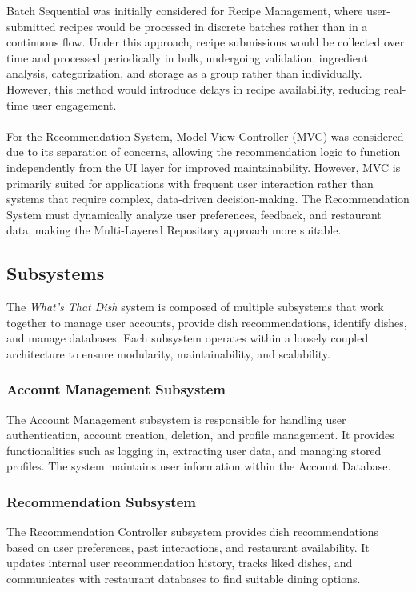 \documentclass[]{article}
\begin{document}
Batch Sequential was initially considered for Recipe Management, where user-submitted recipes would be processed in discrete batches rather than in a continuous flow. Under this approach, recipe submissions would be collected over time and processed periodically in bulk, undergoing validation, ingredient analysis, categorization, and storage as a group rather than individually. However, this method would introduce delays in recipe availability, reducing real-time user engagement. 
\\
\\
For the Recommendation System, Model-View-Controller (MVC) was considered due to its separation of concerns, allowing the recommendation logic to function independently from the UI layer for improved maintainability. However, MVC is primarily suited for applications with frequent user interaction rather than systems that require complex, data-driven decision-making. The Recommendation System must dynamically analyze user preferences, feedback, and restaurant data, making the Multi-Layered Repository approach more suitable.

\subsection{Subsystems}
\label{sub:subsystems}

The \textit{What’s That Dish} system is composed of multiple subsystems that work together to manage user accounts, provide dish recommendations, identify dishes, and manage databases. Each subsystem operates within a loosely coupled architecture to ensure modularity, maintainability, and scalability.

\subsubsection{Account Management Subsystem}
The Account Management subsystem is responsible for handling user authentication, account creation, deletion, and profile management. It provides functionalities such as logging in, extracting user data, and managing stored profiles. The system maintains user information within the Account Database.

\subsubsection{Recommendation Subsystem}
The Recommendation Controller subsystem provides dish recommendations based on user preferences, past interactions, and restaurant availability. It updates internal user recommendation history, tracks liked dishes, and communicates with restaurant databases to find suitable dining options.
\end{document}
